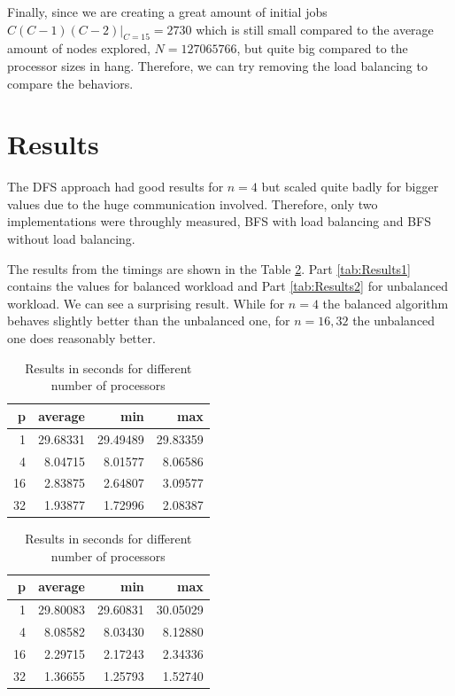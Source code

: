 \documentclass[a4paper]{article}
\begin{document}
    Finally, since we are creating a great amount of initial jobs $C(C-1)(C-2)\bigr|_{C=15} = 2730$ which is still small compared to the average amount of nodes explored, $N = 127065766$, but quite big compared to the processor sizes in hang. Therefore, we can try removing the load balancing to compare the behaviors.

\section{Results}

    The DFS approach had good results for $n = 4$ but scaled quite badly for bigger values due to the huge communication involved. Therefore, only two implementations were throughly measured, BFS with load balancing and BFS without load balancing.

    The results from the timings are shown in the Table \ref{tab:Results}. Part \ref{tab:Results1} contains the values for balanced workload and Part \ref{tab:Results2} for unbalanced workload. We can see a surprising result. While for $n = 4$ the balanced algorithm behaves slightly better than the unbalanced one, for $n = 16,32$ the unbalanced one does reasonably better.

    \begin{table}[!htb]
        \begin{subtable}{.5\linewidth}
          \centering
            \begin{tabular}{*{4}{r}}
            \textbf{p} &   \textbf{average} &       \textbf{min} &       \textbf{max} \\
                \midrule
                1 & 29.68331 & 29.49489 & 29.83359\\
                4 & 8.04715 & 8.01577 & 8.06586\\
                16 & 2.83875 & 2.64807 & 3.09577\\
                32 & 1.93877 & 1.72996 & 2.08387\\
            \end{tabular}
            \caption{Results for a balanced workload}
            \label{tab:Results1}
        \end{subtable}%
        \begin{subtable}{.5\linewidth}
          \centering
            \begin{tabular}{*{4}{r}}
            \textbf{p} &   \textbf{average} &       \textbf{min} &       \textbf{max} \\
                \midrule
                1 & 29.80083 & 29.60831 & 30.05029\\
                4 & 8.08582 & 8.03430 & 8.12880\\
                16 & 2.29715 & 2.17243 & 2.34336\\
                32 & 1.36655 & 1.25793 & 1.52740\\
            \end{tabular}
            \caption{Results for an unbalanced workload}
            \label{tab:Results2}
        \end{subtable}%
        \caption{Results in seconds for different number of processors}
        \label{tab:Results}
    \end{table}
\end{document}

